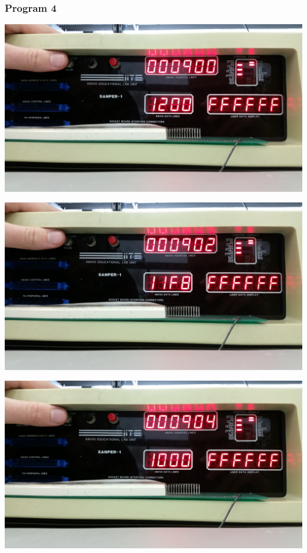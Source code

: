 \documentclass[12pt, twocolumn]{article}
\begin{document}
\subsubsection{Program 4}
\label{progpic4}
\begin{center}
\includegraphics[width=1\linewidth]{Lab1/20150120_094835}
\end{center}
\begin{center}
\includegraphics[width=1\linewidth]{Lab1/20150120_094837}
\end{center}
\begin{center}
\includegraphics[width=1\linewidth]{Lab1/20150120_094838}
\end{center}
\end{document}
